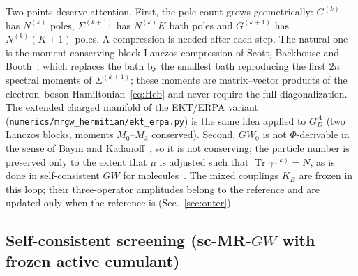 \documentclass[11pt,a4paper]{article}
\newcommand{\GW}{$GW$}
\newcommand{\MRGW}{MR-$GW$}
\begin{document}
Two points deserve attention.  First, the pole count grows geometrically:
$G^{(k)}$ has $N^{(k)}$ poles, $\Sigma^{(k+1)}$ has $N^{(k)}K$ bath poles and
$G^{(k+1)}$ has $N^{(k)}(K+1)$ poles.  A compression is needed after each
step.  The natural one is the moment-conserving block-Lanczos compression of
Scott, Backhouse and Booth~\cite{MCGW2023}, which replaces the bath by the
smallest bath reproducing the first $2n$ spectral moments of
$\Sigma^{(k+1)}$; these moments are matrix--vector products of the
electron--boson Hamiltonian~\eqref{eq:Heb} and never require the full
diagonalization.  The extended charged manifold of the EKT/ERPA variant
(\texttt{numerics/mrgw\_hermitian/ekt\_erpa.py}) is the same idea applied to
$G^A_D$ (two Lanczos blocks, moments $M_0$--$M_3$ conserved).  Second, $GW_0$
is not $\Phi$-derivable in the sense of Baym and
Kadanoff~\cite{BaymKadanoff1961,Baym1962}, so it is not conserving; the
particle number is preserved only to the extent that $\mu$ is adjusted such
that $\operatorname{Tr}\gamma^{(k)}=N$, as is done in self-consistent \GW{}
for molecules~\cite{Caruso2012}.  The mixed couplings $K_B$ are frozen in
this loop; their three-operator amplitudes belong to the reference and are
updated only when the reference is (Sec.~\ref{sec:outer}).

\subsection{Self-consistent screening (sc-\MRGW{} with frozen active cumulant)}
\label{sec:scW}
\end{document}
